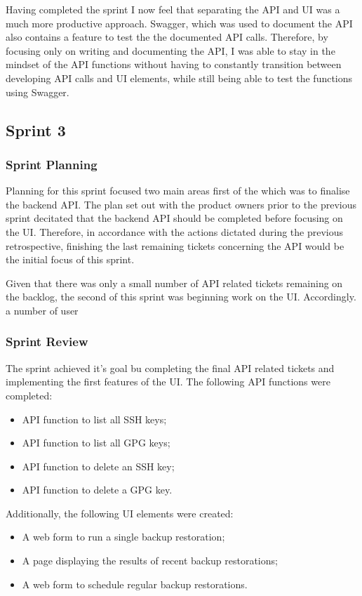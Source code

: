   Having completed the sprint I now feel that separating the API and UI was a much more productive approach. Swagger, which was used to document the API also contains a feature to test the the documented API calls. Therefore, by focusing only on writing and documenting the API, I was able to stay in the mindset of the API functions without having to constantly transition between developing API calls and UI elements, while still being able to test the functions using Swagger.
  
   \subsection{Sprint 3}
   \subsubsection{Sprint Planning}
   Planning for this sprint focused two main areas first of the which was to finalise the backend API. The plan set out with the product owners prior to the previous sprint decitated that the backend API should be completed before focusing on the UI. Therefore, in accordance with the actions dictated during the previous retrospective, finishing the last remaining tickets concerning the API would be the initial focus of this sprint.
   
   Given that there was only a small number of API related tickets remaining on the backlog, the second of this sprint was beginning work on the UI. Accordingly. a number of user 
   
   \subsubsection{Sprint Review}
   The sprint achieved it's goal bu completing the final API related tickets and implementing the first features of the UI. The following API functions were completed:
   \begin{itemize} 
     \item API function to list all SSH keys;
     \item API function to list all GPG keys;
     \item API function to delete an SSH key;
     \item API function to delete a GPG key.
   \end{itemize}
   Additionally, the following UI elements were created:
  \begin{itemize} 
    \item A web form to run a single backup restoration;
    \item A page displaying the results of recent backup restorations;
    \item A web form to schedule regular backup restorations.
  \end{itemize}
  

